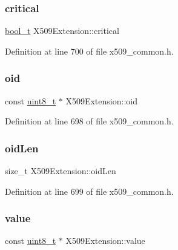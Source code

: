 \subsubsection{\texorpdfstring{critical}{critical}}
{\footnotesize\ttfamily \hyperlink{compiler__port_8h_a812d16e5494522586b3784e55d479912}{bool\+\_\+t} X509\+Extension\+::critical}



Definition at line 700 of file x509\+\_\+common.\+h.

\mbox{\label{structX509Extension_a3bb16b166862712604b01d136b6cdab2}} 
\subsubsection{\texorpdfstring{oid}{oid}}
{\footnotesize\ttfamily const \hyperlink{stdint_8h_aba7bc1797add20fe3efdf37ced1182c5}{uint8\+\_\+t} $\ast$ X509\+Extension\+::oid}



Definition at line 698 of file x509\+\_\+common.\+h.

\mbox{\label{structX509Extension_a6d4c36c0f0ba38c228a1dc3cf20e4981}} 
\subsubsection{\texorpdfstring{oid\+Len}{oidLen}}
{\footnotesize\ttfamily size\+\_\+t X509\+Extension\+::oid\+Len}



Definition at line 699 of file x509\+\_\+common.\+h.

\mbox{\label{structX509Extension_a0ae0ef35ada444d669c37c0ba83856be}} 
\subsubsection{\texorpdfstring{value}{value}}
{\footnotesize\ttfamily const \hyperlink{stdint_8h_aba7bc1797add20fe3efdf37ced1182c5}{uint8\+\_\+t} $\ast$ X509\+Extension\+::value}



